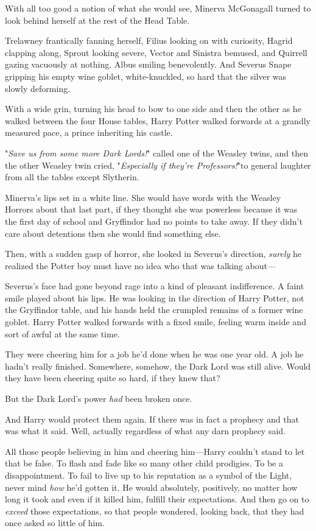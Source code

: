 With all too good a notion of what she would see, Minerva McGonagall turned to
look behind herself at the rest of the Head Table.

Trelawney frantically fanning herself, Filius looking on with curiosity, Hagrid
clapping along, Sprout looking severe, Vector and Sinistra bemused, and
Quirrell gazing vacuously at nothing. Albus smiling benevolently. And Severus
Snape gripping his empty wine goblet, white-knuckled, so hard that the silver
was slowly deforming.

With a wide grin, turning his head to bow to one side and then the other as he
walked between the four House tables, Harry Potter walked forwards at a grandly
measured pace, a prince inheriting his castle.

"\emph{Save us from some more Dark Lords!}" called one of the Weasley twins,
and then the other Weasley twin cried, "\emph{Especially if they're
Professors!}"to general laughter from all the tables except Slytherin.

Minerva's lips set in a white line. She would have words with the Weasley
Horrors about that last part, if they thought she was powerless because it was
the first day of school and Gryffindor had no points to take away. If they
didn't care about detentions then she would find something else.

Then, with a sudden gasp of horror, she looked in Severus's direction,
\emph{surely} he realized the Potter boy must have no idea who that was talking
about—

Severus's face had gone beyond rage into a kind of pleasant indifference. A
faint smile played about his lips. He was looking in the direction of Harry
Potter, not the Gryffindor table, and his hands held the crumpled remains of a
former wine goblet.
\sbreak
Harry Potter walked forwards with a fixed smile, feeling warm inside and sort
of awful at the same time.

They were cheering him for a job he'd done when he was one year old. A job he
hadn't really finished. Somewhere, somehow, the Dark Lord was still alive.
Would they have been cheering quite so hard, if they knew that?

But the Dark Lord's power \emph{had} been broken once.

And Harry would protect them again. If there was in fact a prophecy and that
was what it said. Well, actually regardless of what any darn prophecy said.

All those people believing in him and cheering him—Harry couldn't stand to
let that be false. To flash and fade like so many other child prodigies. To be
a disappointment. To fail to live up to his reputation as a symbol of the
Light, never mind \emph{how} he'd gotten it. He would absolutely, positively,
no matter how long it took and even if it killed him, fulfill their
expectations. And then go on to \emph{exceed} those expectations, so that
people wondered, looking back, that they had once asked so little of him.

